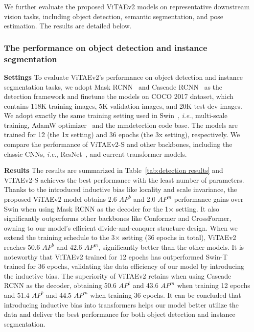 \documentclass[twocolumn]{svjour3}          \smartqed  \usepackage{natbib}
\newcommand{\ie}{i.e}
\def\onedot{.\xspace}
\def\ie{\emph{i.e}\onedot}
\begin{document}
We further evaluate the proposed ViTAEv2 models on representative downstream vision tasks, including object detection, semantic segmentation, and pose estimation. The results are detailed below.

\subsubsection{The performance on object detection and instance segmentation}

\textbf{Settings} To evaluate ViTAEv2's performance on object detection and instance segmentation tasks, we adopt Mask RCNN~\citep{he2017mask} and Cascade RCNN~\citep{cai2018cascade} as the detection framework and finetune the models on COCO 2017 dataset, which contains 118K training images, 5K validation images, and 20K test-dev images. We adopt exactly the same training setting used in Swin~\citep{liu2021swin}, \ie, multi-scale training, AdamW optimizer~\citep{loshchilov2017decoupled} and the mmdetection code base. The models are trained for 12 (the 1x setting) and 36 epochs (the 3x setting), respectively. We compare the performance of ViTAEv2-S and other backbones, including the classic CNNs, \ie, ResNet~\citep{he2016deep}, and current transformer models.

\noindent \textbf{Results} The results are summarized in Table~\ref{tab:detection results} and ViTAEv2-S achieves the best performance with the least number of parameters. Thanks to the introduced inductive bias like locality and scale invariance, the proposed ViTAEv2 model obtains 2.6 $AP^{b}$ and 2.0 $AP^{m}$ performance gains over Swin when using Mask RCNN as the decoder for the 1$\times$ setting. It also significantly outperforms other backbones like Conformer and CrossFormer, owning to our model's efficient divide-and-conquer structure design. When we extend the training schedule to the 3$\times$ setting (36 epochs in total), ViTAEv2 reaches 50.6 $AP^b$ and 42.6 $AP^m$, significantly better than the other models. It is noteworthy that ViTAEv2 trained for 12 epochs has outperformed Swin-T trained for 36 epochs, validating the data efficiency of our model by introducing the inductive bias. The superiority of ViTAEv2 retains when using Cascade RCNN as the decoder, obtaining 50.6 $AP^b$ and 43.6 $AP^m$ when training 12 epochs and 51.4 $AP^b$ and 44.5 $AP^m$ when training 36 epochs. It can be concluded that introducing inductive bias into transformers helps our model better utilize the data and deliver the best performance for both object detection and instance segmentation.
\end{document}
